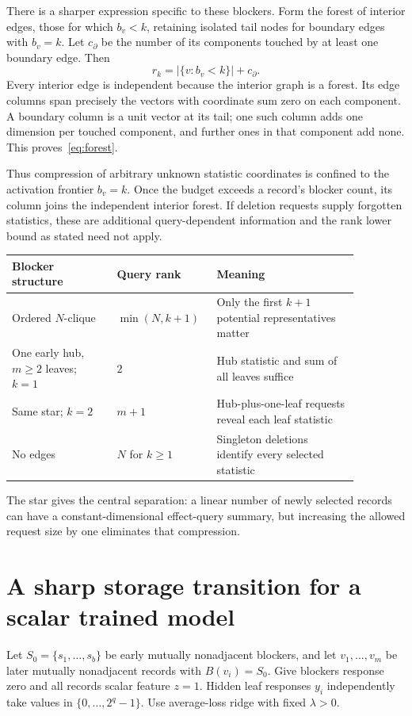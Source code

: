 \documentclass[11pt,a4paper]{article}
\theoremstyle{definition}\newtheorem{definition}[theorem]{Definition}
\begin{document}
There is a sharper expression specific to these blockers. Form the forest of interior edges, those for which $b_v<k$, retaining isolated tail nodes for boundary edges with $b_v=k$. Let $c_{\partial}$ be the number of its components touched by at least one boundary edge. Then
\begin{equation}\label{eq:forest}
 r_k=|\{v:b_v<k\}|+c_{\partial}.
\end{equation}
Every interior edge is independent because the interior graph is a forest. Its edge columns span precisely the vectors with coordinate sum zero on each component. A boundary column is a unit vector at its tail; one such column adds one dimension per touched component, and further ones in that component add none. This proves~\eqref{eq:forest}.

Thus compression of arbitrary unknown statistic coordinates is confined to the activation frontier $b_v=k$. Once the budget exceeds a record's blocker count, its column joins the independent interior forest. If deletion requests supply forgotten statistics, these are additional query-dependent information and the rank lower bound as stated need not apply.

\begin{center}\small
\begin{tabular}{p{0.28\linewidth}p{0.21\linewidth}p{0.38\linewidth}}
\toprule
Blocker structure & Query rank & Meaning\\
\midrule
Ordered $N$-clique & $\min(N,k+1)$ & Only the first $k+1$ potential representatives matter\\
One early hub, $m\ge2$ leaves; $k=1$ & $2$ & Hub statistic and sum of all leaves suffice\\
Same star; $k=2$ & $m+1$ & Hub-plus-one-leaf requests reveal each leaf statistic\\
No edges & $N$ for $k\ge1$ & Singleton deletions identify every selected statistic\\
\bottomrule
\end{tabular}
\end{center}
The star gives the central separation: a linear number of newly selected records can have a constant-dimensional effect-query summary, but increasing the allowed request size by one eliminates that compression.

\section{A sharp storage transition for a scalar trained model}\label{sec:phase}
Let $S_0=\{s_1,\ldots,s_b\}$ be early mutually nonadjacent blockers, and let $v_1,\ldots,v_m$ be later mutually nonadjacent records with $B(v_i)=S_0$. Give blockers response zero and all records scalar feature $z=1$. Hidden leaf responses $y_i$ independently take values in $\{0,\ldots,2^q-1\}$. Use average-loss ridge with fixed $\lambda>0$.
\end{document}
